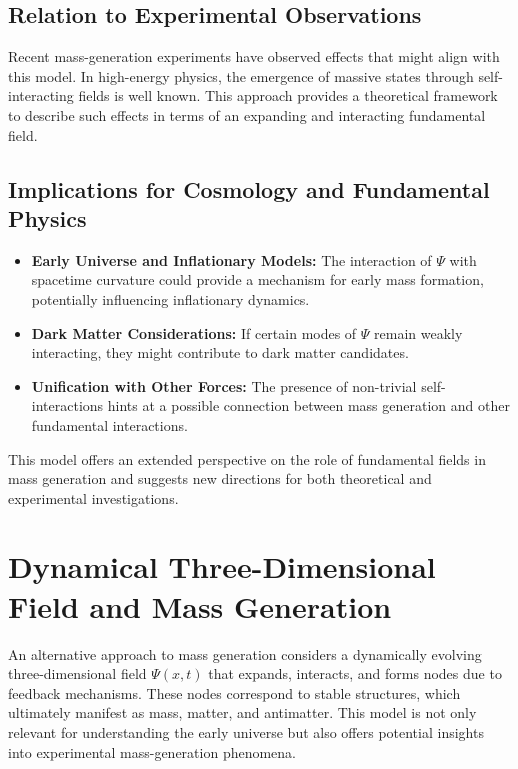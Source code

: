\documentclass[a4paper,11pt]{article}
\begin{document}
\subsection{Relation to Experimental Observations}
Recent mass-generation experiments have observed effects that might align with this model. In high-energy physics, the emergence of massive states through self-interacting fields is well known. This approach provides a theoretical framework to describe such effects in terms of an expanding and interacting fundamental field.

\subsection{Implications for Cosmology and Fundamental Physics}
\begin{itemize}
	\item \textbf{Early Universe and Inflationary Models:} The interaction of $\Psi$ with spacetime curvature could provide a mechanism for early mass formation, potentially influencing inflationary dynamics.
	\item \textbf{Dark Matter Considerations:} If certain modes of $\Psi$ remain weakly interacting, they might contribute to dark matter candidates.
	\item \textbf{Unification with Other Forces:} The presence of non-trivial self-interactions hints at a possible connection between mass generation and other fundamental interactions.
\end{itemize}
This model offers an extended perspective on the role of fundamental fields in mass generation and suggests new directions for both theoretical and experimental investigations.
\section{Dynamical Three-Dimensional Field and Mass Generation}
An alternative approach to mass generation considers a dynamically evolving three-dimensional field $\Psi(x,t)$ that expands, interacts, and forms nodes due to feedback mechanisms. These nodes correspond to stable structures, which ultimately manifest as mass, matter, and antimatter. This model is not only relevant for understanding the early universe but also offers potential insights into experimental mass-generation phenomena.
\end{document}
